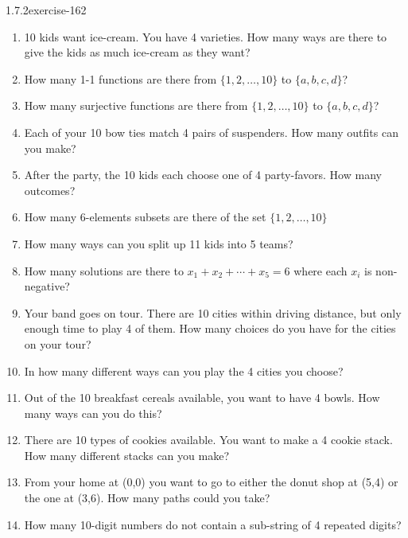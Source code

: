 \documentclass[twoside,11pt,]{book}
\numberwithin{equation}{chapter}
\begin{document}
\begin{divisionsolution}{1.7.2}{}{exercise-162}
\begin{enumerate}[label=(\alph*)]
\item\hypertarget{li-1552}{}\hypertarget{p-2639}{}%
10 kids want ice-cream. You have 4 varieties. How many ways are there to give the kids as much ice-cream as they want?%
\item\hypertarget{li-1553}{}\hypertarget{p-2640}{}%
How many 1-1 functions are there from \(\{1,2,\ldots, 10\}\) to \(\{a,b,c,d\}\)?%
\item\hypertarget{li-1554}{}\hypertarget{p-2641}{}%
How many surjective functions are there from \(\{1,2,\ldots, 10\}\) to \(\{a,b,c,d\}\)?%
\item\hypertarget{li-1555}{}\hypertarget{p-2642}{}%
Each of your 10 bow ties match 4 pairs of suspenders. How many outfits can you make?%
\item\hypertarget{li-1556}{}\hypertarget{p-2643}{}%
After the party, the 10 kids each choose one of 4 party-favors. How many outcomes?%
\item\hypertarget{li-1557}{}\hypertarget{p-2644}{}%
How many 6-elements subsets are there of the set \(\{1,2,\ldots, 10\}\)%
\item\hypertarget{li-1558}{}\hypertarget{p-2645}{}%
How many ways can you split up 11 kids into 5 teams?%
\item\hypertarget{li-1559}{}\hypertarget{p-2646}{}%
How many solutions are there to \(x_1 + x_2 + \cdots + x_5 = 6\) where each \(x_i\) is non-negative?%
\item\hypertarget{li-1560}{}\hypertarget{p-2647}{}%
Your band goes on tour. There are 10 cities within driving distance, but only enough time to play 4 of them. How many choices do you have for the cities on your tour?%
\item\hypertarget{li-1561}{}\hypertarget{p-2648}{}%
In how many different ways can you play the 4 cities you choose?%
\item\hypertarget{li-1562}{}\hypertarget{p-2649}{}%
Out of the 10 breakfast cereals available, you want to have 4 bowls. How many ways can you do this?%
\item\hypertarget{li-1563}{}\hypertarget{p-2650}{}%
There are 10 types of cookies available. You want to make a 4 cookie stack. How many different stacks can you make?%
\item\hypertarget{li-1564}{}\hypertarget{p-2651}{}%
From your home at (0,0) you want to go to either the donut shop at (5,4) or the one at (3,6). How many paths could you take?%
\item\hypertarget{li-1565}{}\hypertarget{p-2652}{}%
How many 10-digit numbers do not contain a sub-string of 4 repeated digits?%

\end{enumerate}
\end{divisionsolution}
\end{document}
